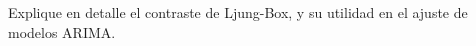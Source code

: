 \addpoints
\question[10] Explique en detalle el contraste de Ljung-Box, y su utilidad en el ajuste de modelos ARIMA.